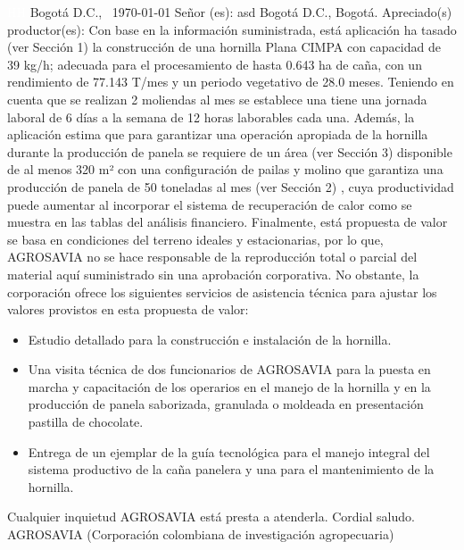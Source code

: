 \documentclass{article}%
\begin{document}
\begin{large}%
\textcolor{white}{ 
HH
}%
\linebreak%
Bogotá D.C., %
\ {\today}%
\newline%
 \newline%
%
\linebreak%
\newline%
Señor (es):%
\newline%
asd%
\newline%
Bogotá D.C., Bogotá.%
\newline%
 \newline%
%
\newline%
Apreciado(s) productor(es):%
\newline%
 \newline%
%
Con base en la información suministrada, está aplicación ha tasado (ver Sección 1) la construcción de una hornilla Plana CIMPA con capacidad de 39 kg/h; adecuada para el procesamiento de hasta 0.643 ha de caña, con un rendimiento de 77.143 T/mes y un periodo vegetativo de 28.0 meses. Teniendo en cuenta que se realizan 2 moliendas al mes se establece una tiene una jornada laboral de 6 días a la semana de 12 horas laborables cada una. \newline%
 Además, la aplicación estima que para garantizar una operación apropiada de la hornilla durante la producción de panela se requiere de un área (ver Sección 3) disponible de al menos 320 m² con una configuración de pailas y molino que garantiza una producción de panela de 50 toneladas al mes (ver Sección 2)%
, cuya productividad puede aumentar al incorporar el sistema de recuperación de calor como se muestra en las tablas del análisis financiero.%
\newline%
 Finalmente, está propuesta de valor se basa en condiciones del terreno ideales y estacionarias, por lo que, AGROSAVIA no se hace responsable de la reproducción total o parcial del material aquí suministrado sin una aprobación corporativa. No obstante, la corporación ofrece los siguientes servicios de asistencia técnica para ajustar los valores provistos en esta propuesta de valor:%
\begin{itemize}%
\item%
Estudio detallado para la construcción e instalación de la hornilla.%
\item%
Una visita técnica de dos funcionarios de AGROSAVIA para la puesta en marcha y capacitación de los operarios en el manejo de la hornilla y en la producción de panela saborizada, granulada o moldeada en presentación pastilla de chocolate.%
\item%
Entrega de un ejemplar de la guía tecnológica para el manejo integral del sistema productivo de la caña panelera y una para el mantenimiento de la hornilla.%
\end{itemize}%
Cualquier inquietud AGROSAVIA está presta a atenderla.\newline%
Cordial saludo.\newline%
\newline%
 \newline%
 \newline%
 \newline%
AGROSAVIA (Corporación colombiana de investigación agropecuaria)%
\end{large}%
\end{document}
